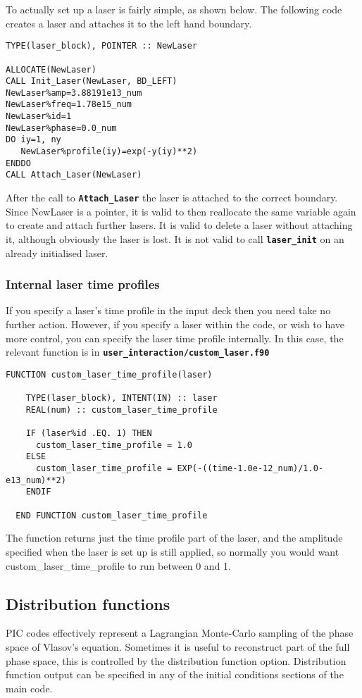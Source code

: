 \documentclass[12pt,a4paper]{article}
\newcommand{\simpleboxverbatim}{\begin{Verbatim}[obeytabs=true,frame=single,
  framerule=0.5mm,rulecolor=\color{warwickmid},formatcom=\color{black}]}
\newcommand{\inlinecode}[1]{{\color{warwickred} \bf\texttt{#1}}}
\begin{document}
To actually set up a laser is fairly simple, as shown below. The following
code creates a laser and attaches it to the left hand boundary.
\simpleboxverbatim
TYPE(laser_block), POINTER :: NewLaser

ALLOCATE(NewLaser)
CALL Init_Laser(NewLaser, BD_LEFT)
NewLaser%amp=3.88191e13_num
NewLaser%freq=1.78e15_num
NewLaser%id=1
NewLaser%phase=0.0_num
DO iy=1, ny
   NewLaser%profile(iy)=exp(-y(iy)**2)
ENDDO
CALL Attach_Laser(NewLaser)
\end{Verbatim}
After the call to \inlinecode{Attach\_Laser} the laser is attached to the
correct boundary. Since NewLaser is a pointer, it is valid to then reallocate
the same variable again to create and attach further lasers. It is valid to
delete a laser without attaching it, although obviously the laser is lost. It
is not valid to call \inlinecode{laser\_init} on an already initialised laser.

\subsubsection{Internal laser time profiles}
If you specify a laser's time profile in the input deck then you need take no
further action. However, if you specify a laser within the code, or wish to
have more control, you can specify the laser time profile internally. In this
case, the relevant function is in
\inlinecode{user\_interaction/custom\_laser.f90}
\simpleboxverbatim
  FUNCTION custom_laser_time_profile(laser)

    TYPE(laser_block), INTENT(IN) :: laser
    REAL(num) :: custom_laser_time_profile

    IF (laser%
      custom_laser_time_profile = 1.0
    ELSE
      custom_laser_time_profile = EXP(-((time-1.0e-12_num)/1.0-e13_num)**2)
    ENDIF

  END FUNCTION custom_laser_time_profile
\end{Verbatim}
The function returns just the time profile part of the laser, and the
amplitude specified when the laser is set up is still applied, so normally you
would want custom\_laser\_time\_profile to run between 0 and 1.

\subsection{Distribution functions}
PIC codes effectively represent a Lagrangian Monte-Carlo sampling of the phase
space of Vlasov's equation. Sometimes it is useful to reconstruct part of the
full phase space, this is controlled by the distribution function
option.  Distribution function output can
be specified in any of the initial conditions sections of the main code.
\end{document}
